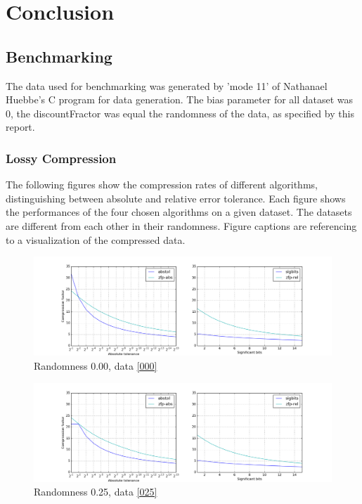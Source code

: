 \documentclass[
	12pt,
	a4paper,
	BCOR10mm,
	DIV14,
	headsepline,
]{scrreprt}
\begin{document}
\chapter{Conclusion}
\label{Conclusion}

\section{Benchmarking}

The data used for benchmarking was generated by 'mode 11' of Nathanael Huebbe's
C program for data generation. The bias parameter for all dataset was 0, the
discountFractor was equal the randomness of the data, as specified by this
report.

\subsection{Lossy Compression}

\bigskip

The following figures show the compression rates of different algorithms,
distinguishing between absolute and relative error tolerance. Each figure shows
the performances of the four chosen algorithms on a given dataset. The datasets
are different from each other in their randomness. Figure captions are
referencing to a visualization of the compressed data.

\begin{figure}[H]
	\centering
	\includegraphics[width=\textwidth]{000_lossy_rates.png}
	\caption{Randomness 0.00, data \ref{000}}
	\label{fig:000_rate}
\end{figure}

\begin{figure}[H]
	\centering
	\includegraphics[width=\textwidth]{025_lossy_rates.png}
	\caption{Randomness 0.25, data \ref{025}}
	\label{fig:025_rate}
\end{figure}
\end{document}
